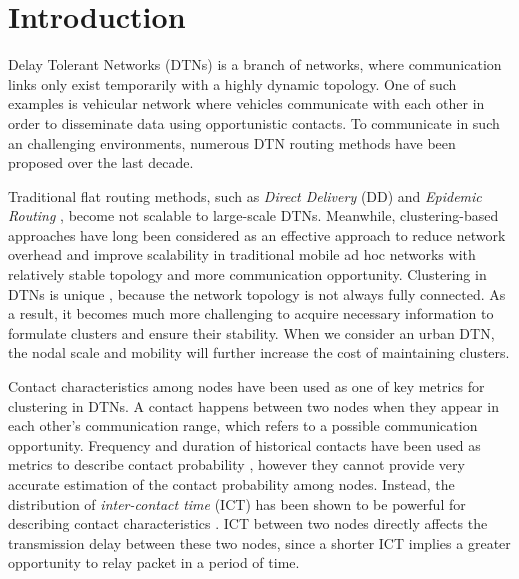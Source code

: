 \documentclass[conference]{IEEEtran}
\begin{document}
\section{Introduction}
\label{INTRODUCTION}
Delay Tolerant Networks (DTNs) \cite{aFall-2,cAhmedSalil-4} is a branch of networks,
where communication links only exist temporarily with a highly dynamic topology. One of such examples is vehicular network where vehicles communicate with each other in order to disseminate data using opportunistic contacts. To communicate in such an challenging environments, numerous DTN routing methods have been proposed over the last decade.

Traditional flat routing methods, such as \emph{Direct Delivery} (DD) \cite{eKleywegtNori-6} and \emph{Epidemic Routing} \cite{gVahdatBecker-8}, become not scalable to large-scale DTNs. Meanwhile, clustering-based approaches have long been considered as an effective approach to reduce network overhead and improve scalability in traditional mobile ad hoc networks \cite{hAgarwalMotwani-9,iLiuLiu-10,jWangMi-11,kWhitbeckConan-12} with relatively stable topology and more communication opportunity.
Clustering in DTNs is unique \cite{uHaHongyi-22,kernal2005survey}, because the network topology is not always fully connected. As a result, it becomes much more challenging to acquire necessary information to formulate clusters and ensure their stability. When we consider an urban DTN, the nodal scale and mobility will further increase the cost of maintaining clusters.

Contact characteristics among nodes \cite{nGaoCao-15,oWhitbeckConan-16,p20102413007279} have been used as one of key metrics for clustering in DTNs. A contact happens between two nodes when they appear in each other's communication range, which refers to a possible communication opportunity. Frequency and duration of historical contacts have been used as metrics to describe contact probability \cite{rLiHui-19,t20102413006168}, however they cannot provide very accurate estimation of the contact probability among nodes. Instead, the distribution of  \emph{inter-contact time} (ICT) has been shown to be powerful for describing contact characteristics \cite{rLiHui-19,qGroeneveltNain-18,s20104613388174}. ICT between two nodes directly affects the transmission delay between these two nodes, since a shorter ICT implies a greater opportunity to relay packet in a period of time.
\end{document}

